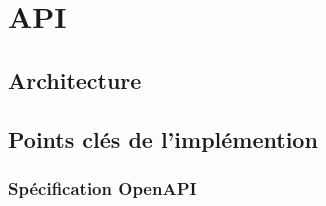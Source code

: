 \section{API}

\subsection{Architecture}

\subsection{Points clés de l'implémention}

\subsubsection*{Spécification OpenAPI}